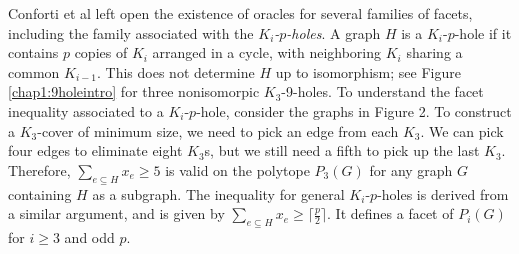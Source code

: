 Conforti et al left open the existence of oracles for several families of facets, including the family associated with the {\em $K_i$-$p$-holes}. 
A graph $H$ is a $K_i$-$p$-hole if it contains $p$ copies of $K_i$ arranged in a cycle, with neighboring $K_i$ sharing a common $K_{i-1}$. 
This does not determine $H$ up to isomorphism; see Figure \ref{chap1:9holeintro} for three nonisomorpic $K_3$-9-holes.
To understand the facet inequality associated to a $K_i$-$p$-hole, consider the graphs in Figure 2. 
To construct a $K_3$-cover of minimum size, we need to pick an edge from each $K_3$. 
We can pick four edges to eliminate eight $K_3$s, but we still need a fifth to pick up the last $K_3$. 
Therefore, $\sum_{e \subseteq H} x_e \ge 5$ is valid on the polytope $P_3(G)$ for any graph $G$ containing $H$ as a subgraph. 
The inequality for general $K_i$-$p$-holes is derived from a similar argument, and is given by $\sum_{e \subseteq H} x_e \ge \lceil \frac{p}{2} \rceil$.
It defines a facet of $P_i(G)$ for $i \ge 3$ and odd $p$.

